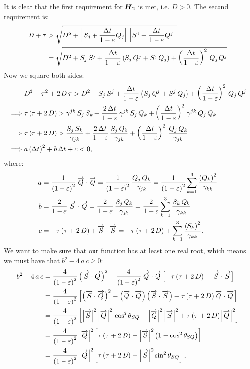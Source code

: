 It is clear that the first requirement for $\boldsymbol{H}_{2}$ is met, i.e. $D>0$. The second requirement is:
\begin{align}
    D+\tau&>\sqrt{D^{2}+\left[S_{j}+\frac{\Delta t}{1-\varepsilon}Q_{j}\right] \left[S^{j}+\frac{\Delta t}{1-\varepsilon}Q^{j}\right]}\\
    &=\sqrt{D^{2}+S_{j}\,S^{j}+\frac{\Delta t}{1-\varepsilon}\left(S_{j}\,Q^{j}+S^{j}\,Q_{j}\right)+\left(\frac{\Delta t}{1-\varepsilon}\right)^{2}\,Q_{j}\,Q^{j}}
\end{align}
Now we square both sides:
\begin{align}
    &D^{2}+\tau^{2}+2\,D\,\tau>D^{2}+S_{j}\,S^{j}+\frac{\Delta t}{1-\varepsilon}\left(S_{j}\,Q^{j}+S^{j}\,Q_{j}\right)+\left(\frac{\Delta t}{1-\varepsilon}\right)^{2}\,Q_{j}\,Q^{j}\\
    \implies&\tau\left(\tau+2\,D\right)>\gamma^{jk}\,S_{j}\,S_{k}+\frac{2\,\Delta t}{1-\varepsilon}\,\gamma^{jk}\,S_{j}\,Q_{k}+\left(\frac{\Delta t}{1-\varepsilon}\right)^{2}\,\gamma^{jk}\,Q_{j}\,Q_{k}\\
    \implies&\tau\left(\tau+2\,D\right)>\frac{S_{j}\,S_{k}}{\gamma_{jk}}+\frac{2\,\Delta t}{1-\varepsilon}\,\frac{S_{j}\,Q_{k}}{\gamma_{jk}}+\left(\frac{\Delta t}{1-\varepsilon}\right)^{2}\,\frac{Q_{j}\,Q_{k}}{\gamma_{jk}}\\
    \implies&a\left(\Delta t\right)^{2}+b\,\Delta t+c<0,
\end{align}
where:
\begin{align}
    a&=\frac{1}{\left(1-\varepsilon\right)^{2}}\,\overrightarrow{Q}\cdot\overrightarrow{Q}=\frac{1}{\left(1-\varepsilon\right)^{2}}\,\frac{Q_{j}\,Q_{k}}{\gamma_{jk}}=\frac{1}{\left(1-\varepsilon\right)^{2}}\sum\limits_{k=1}^{3}\frac{\left(Q_{k}\right)^{2}}{\gamma_{kk}}\\
    b&=\frac{2}{1-\varepsilon}\,\overrightarrow{S}\cdot\overrightarrow{Q}=\frac{2}{1-\varepsilon}\,\frac{S_{j}\,Q_{k}}{\gamma_{jk}}=\frac{2}{1-\varepsilon}\sum\limits_{k=1}^{3}\frac{S_{k}\,Q_{k}}{\gamma_{kk}}\\
    c&=-\tau\left(\tau+2\,D\right)+\overrightarrow{S}\cdot\overrightarrow{S}=-\tau\left(\tau+2\,D\right)+\sum\limits_{k=1}^{3}\frac{\left(S_{k}\right)^{2}}{\gamma_{kk}}.
\end{align}
We want to make sure that our function has at least one real root, which means we must have that $b^{2}-4\,a\,c\geq0$:
\begin{align}
    b^{2}-4\,a\,c&=\frac{4}{\left(1-\varepsilon\right)^{2}}\left(\overrightarrow{S}\cdot\overrightarrow{Q}\right)^{2}-\frac{4}{\left(1-\varepsilon\right)^{2}}\,\overrightarrow{Q}\cdot\overrightarrow{Q}\left[-\tau\left(\tau+2\,D\right)+\overrightarrow{S}\cdot\overrightarrow{S}\right]\\
    &=\frac{4}{\left(1-\varepsilon\right)^{2}}\left[\left(\overrightarrow{S}\cdot\overrightarrow{Q}\right)^{2}-\left(\overrightarrow{Q}\cdot\overrightarrow{Q}\right)\left(\overrightarrow{S}\cdot\overrightarrow{S}\right)+\tau\left(\tau+2\,D\right)\overrightarrow{Q}\cdot\overrightarrow{Q}\right]\\
    &=\frac{4}{\left(1-\varepsilon\right)^{2}}\left[\left|\overrightarrow{S}\right|^{2}\left|\overrightarrow{Q}\right|^{2}\,\cos^{2}\theta_{SQ}-\left|\overrightarrow{Q}\right|^{2}\left|\overrightarrow{S}\right|^{2}+\tau\left(\tau+2\,D\right)\left|\overrightarrow{Q}\right|^{2}\right]\\
    &=\frac{4}{\left(1-\varepsilon\right)^{2}}\left|\overrightarrow{Q}\right|^{2}\left[\tau\left(\tau+2\,D\right)-\left|\overrightarrow{S}\right|^{2}\left(1-\cos^{2}\theta_{SQ}\right)\right]\\
    &=\frac{4}{\left(1-\varepsilon\right)^{2}}\left|\overrightarrow{Q}\right|^{2}\left[\tau\left(\tau+2\,D\right)-\left|\overrightarrow{S}\right|^{2}\sin^{2}\theta_{SQ}\right],
\end{align}
